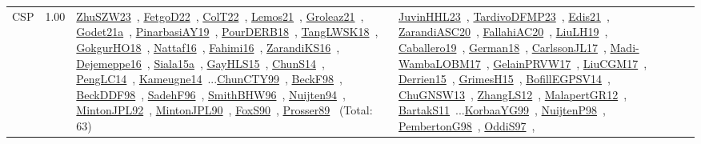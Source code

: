 {\begin{longtable}{p{3cm}r>{\raggedright\arraybackslash}p{6cm}>{\raggedright\arraybackslash}p{6cm}>{\raggedright\arraybackslash}p{8cm}}
\index{CSP}\index{CP!CSP}CSP &  1.00 & \href{../works/ZhuSZW23.pdf}{ZhuSZW23}~\cite{ZhuSZW23}, \href{../works/FetgoD22.pdf}{FetgoD22}~\cite{FetgoD22}, \href{../works/ColT22.pdf}{ColT22}~\cite{ColT22}, \href{../works/Lemos21.pdf}{Lemos21}~\cite{Lemos21}, \href{../works/Groleaz21.pdf}{Groleaz21}~\cite{Groleaz21}, \href{../works/Godet21a.pdf}{Godet21a}~\cite{Godet21a}, \href{../works/PinarbasiAY19.pdf}{PinarbasiAY19}~\cite{PinarbasiAY19}, \href{../works/PourDERB18.pdf}{PourDERB18}~\cite{PourDERB18}, \href{../works/TangLWSK18.pdf}{TangLWSK18}~\cite{TangLWSK18}, \href{../works/GokgurHO18.pdf}{GokgurHO18}~\cite{GokgurHO18}, \href{../works/Nattaf16.pdf}{Nattaf16}~\cite{Nattaf16}, \href{../works/Fahimi16.pdf}{Fahimi16}~\cite{Fahimi16}, \href{../works/ZarandiKS16.pdf}{ZarandiKS16}~\cite{ZarandiKS16}, \href{../works/Dejemeppe16.pdf}{Dejemeppe16}~\cite{Dejemeppe16}, \href{../works/Siala15a.pdf}{Siala15a}~\cite{Siala15a}, \href{../works/GayHLS15.pdf}{GayHLS15}~\cite{GayHLS15}, \href{../works/ChunS14.pdf}{ChunS14}~\cite{ChunS14}, \href{../works/PengLC14.pdf}{PengLC14}~\cite{PengLC14}, \href{../works/Kameugne14.pdf}{Kameugne14}~\cite{Kameugne14}...\href{../works/ChunCTY99.pdf}{ChunCTY99}~\cite{ChunCTY99}, \href{../works/BeckF98.pdf}{BeckF98}~\cite{BeckF98}, \href{../works/BeckDDF98.pdf}{BeckDDF98}~\cite{BeckDDF98}, \href{../works/SadehF96.pdf}{SadehF96}~\cite{SadehF96}, \href{../works/SmithBHW96.pdf}{SmithBHW96}~\cite{SmithBHW96}, \href{../works/Nuijten94.pdf}{Nuijten94}~\cite{Nuijten94}, \href{../works/MintonJPL92.pdf}{MintonJPL92}~\cite{MintonJPL92}, \href{../works/MintonJPL90.pdf}{MintonJPL90}~\cite{MintonJPL90}, \href{../works/FoxS90.pdf}{FoxS90}~\cite{FoxS90}, \href{../works/Prosser89.pdf}{Prosser89}~\cite{Prosser89} (Total: 63) & \href{../works/JuvinHHL23.pdf}{JuvinHHL23}~\cite{JuvinHHL23}, \href{../works/TardivoDFMP23.pdf}{TardivoDFMP23}~\cite{TardivoDFMP23}, \href{../works/Edis21.pdf}{Edis21}~\cite{Edis21}, \href{../works/ZarandiASC20.pdf}{ZarandiASC20}~\cite{ZarandiASC20}, \href{../works/FallahiAC20.pdf}{FallahiAC20}~\cite{FallahiAC20}, \href{../works/LiuLH19.pdf}{LiuLH19}~\cite{LiuLH19}, \href{../works/Caballero19.pdf}{Caballero19}~\cite{Caballero19}, \href{../works/German18.pdf}{German18}~\cite{German18}, \href{../works/CarlssonJL17.pdf}{CarlssonJL17}~\cite{CarlssonJL17}, \href{../works/Madi-WambaLOBM17.pdf}{Madi-WambaLOBM17}~\cite{Madi-WambaLOBM17}, \href{../works/GelainPRVW17.pdf}{GelainPRVW17}~\cite{GelainPRVW17}, \href{../works/LiuCGM17.pdf}{LiuCGM17}~\cite{LiuCGM17}, \href{../works/Derrien15.pdf}{Derrien15}~\cite{Derrien15}, \href{../works/GrimesH15.pdf}{GrimesH15}~\cite{GrimesH15}, \href{../works/BofillEGPSV14.pdf}{BofillEGPSV14}~\cite{BofillEGPSV14}, \href{../works/ChuGNSW13.pdf}{ChuGNSW13}~\cite{ChuGNSW13}, \href{../works/ZhangLS12.pdf}{ZhangLS12}~\cite{ZhangLS12}, \href{../works/MalapertGR12.pdf}{MalapertGR12}~\cite{MalapertGR12}, \href{../works/BartakS11.pdf}{BartakS11}~\cite{BartakS11}...\href{../works/KorbaaYG99.pdf}{KorbaaYG99}~\cite{KorbaaYG99}, \href{../works/NuijtenP98.pdf}{NuijtenP98}~\cite{NuijtenP98}, \href{../works/PembertonG98.pdf}{PembertonG98}~\cite{PembertonG98}, \href{../works/OddiS97.pdf}{OddiS97}~\cite{OddiS97}, 
\end{longtable}}
